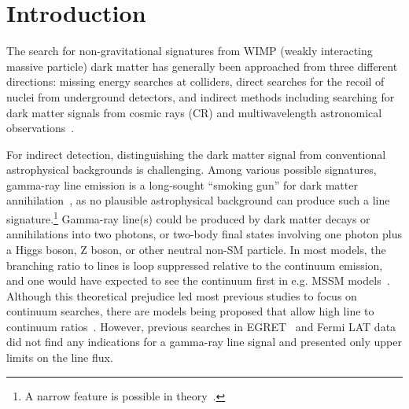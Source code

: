 \documentclass[aps,twocolumn,prd,superscriptaddress,showpacs,nofootinbib,fixfloat]{revtex4}
\begin{document}

\maketitle




\section{Introduction}


The search for non-gravitational signatures from WIMP
(weakly interacting massive particle) dark matter has 
generally been approached from three different directions: missing
energy searches at colliders, direct searches for the
recoil of nuclei from underground detectors, and indirect
methods including searching for dark matter signals from cosmic
rays (CR) and multiwavelength astronomical
observations~\citep{Jungman:1995df, Bergstrom:2000, Bertone:2005, Hooper:2007Review,
2012arXiv1205.4882B, Cirelli:2012tf, Bringmann:2012ez}.

For indirect detection, distinguishing the dark matter
signal from conventional astrophysical backgrounds is
challenging.  Among various possible signatures, gamma-ray
line emission is a long-sought ``smoking
gun'' for dark matter annihilation~\cite{Bergstrom:1988fp}, as no plausible
astrophysical background can produce such a line
signature.\footnote{A narrow feature is
possible in theory~\citep[see][]{2012arXiv1207.0458A}.}  Gamma-ray line(s)
could be produced by dark matter decays or annihilations
into two photons, or two-body final states involving one
photon plus a Higgs boson, Z boson, or other neutral non-SM
particle.  In most models, the branching ratio
to lines is loop suppressed relative to the continuum
emission, and one would have expected to see the continuum
first in e.g. MSSM models~\citep[e.g.][]{Bergstrom:1997}.
Although this theoretical prejudice led most previous
studies to focus on continuum searches, there are models
being proposed that allow high line to continuum
ratios~\citep[e.g.][]{Bergstrom:1998, Bergstrom:2000,
Bertone:2009, Jackson:2010, Cline:2012, Weiner:2012}.
However, previous searches in EGRET~\cite{Pullen:2006sy} and Fermi LAT
data~\cite{Abdo:2010nc, Vertongen:2011mu, Ackermann:2012qk}
did not find any
indications for a gamma-ray line signal and presented only upper limits on the
line flux.
\end{document}
